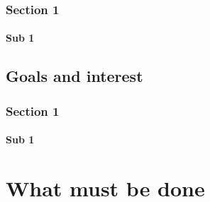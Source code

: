 \documentclass[13pt]{report}
\begin{document}
								\section{Section 1}
									  \subsection{Sub 1}
						\chapter{Goals and interest}
								\section{Section 1}
									  \subsection{Sub 1}
     		\part{What must be done}
     		
\end{document}
